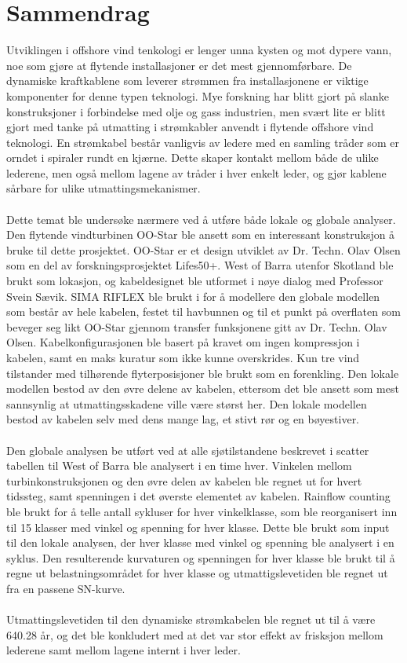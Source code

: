\chapter*{Sammendrag}
Utviklingen i offshore vind tenkologi er lenger unna kysten og mot dypere vann, noe som gjøre at flytende installasjoner er det mest gjennomførbare. De dynamiske kraftkablene som leverer strømmen fra installasjonene er viktige komponenter for denne typen teknologi. Mye forskning har blitt gjort på slanke konstruksjoner i forbindelse med olje og gass industrien, men svært lite er blitt gjort med tanke på utmatting i strømkabler anvendt i flytende offshore vind teknologi. En strømkabel består vanligvis av ledere med en samling tråder som er orndet i spiraler rundt en kjærne. Dette skaper kontakt mellom både de ulike lederene, men også mellom lagene av tråder i hver enkelt leder, og gjør kablene sårbare for ulike utmattingsmekanismer. \\\\
Dette temat ble undersøke nærmere ved å utføre både lokale og globale analyser. Den flytende vindturbinen OO-Star ble ansett som en interessant konstruksjon å bruke til dette prosjektet. OO-Star er et design utviklet av Dr. Techn. Olav Olsen som en del av forskningsprosjektet Lifes50+. West of Barra utenfor Skotland ble brukt som lokasjon, og kabeldesignet ble utformet i nøye dialog med Professor Svein Sævik. SIMA RIFLEX ble brukt i for å modellere den globale modellen som består av hele kabelen, festet til havbunnen og til et punkt på overflaten som beveger seg likt OO-Star gjennom transfer funksjonene gitt av Dr. Techn. Olav Olsen. Kabelkonfigurasjonen ble basert på kravet om ingen kompressjon i kabelen, samt en maks kuratur som ikke kunne overskrides. Kun tre vind tilstander med tilhørende flyterposisjoner ble brukt som en forenkling. Den lokale modellen bestod av den øvre delene av kabelen, ettersom det ble ansett som mest sannsynlig at utmattingsskadene ville være størst her. Den lokale modellen bestod av kabelen selv med dens mange lag, et stivt rør og en bøyestiver.\\\\
Den globale analysen be utført ved at alle sjøtilstandene beskrevet i scatter tabellen til West of Barra ble analysert i en time hver. Vinkelen mellom turbinkonstruksjonen og den øvre delen av kabelen ble regnet ut for hvert tidssteg, samt spenningen i det øverste elementet av kabelen. Rainflow counting ble brukt for å telle antall sykluser for hver vinkelklasse, som ble reorganisert inn til 15 klasser med vinkel og spenning for hver klasse. Dette ble brukt som input til den lokale analysen, der hver klasse  med vinkel og spenning ble analysert i en syklus. Den resulterende kurvaturen og spenningen for hver klasse ble brukt til å regne ut belastningsområdet for hver klasse og utmattigslevetiden ble regnet ut fra en passene SN-kurve. \\\\
Utmattingslevetiden til den dynamiske strømkabelen ble regnet ut til å være 640.28 år, og det ble konkludert med at det var stor effekt av frisksjon mellom lederene samt mellom lagene internt i hver leder. \\\\
